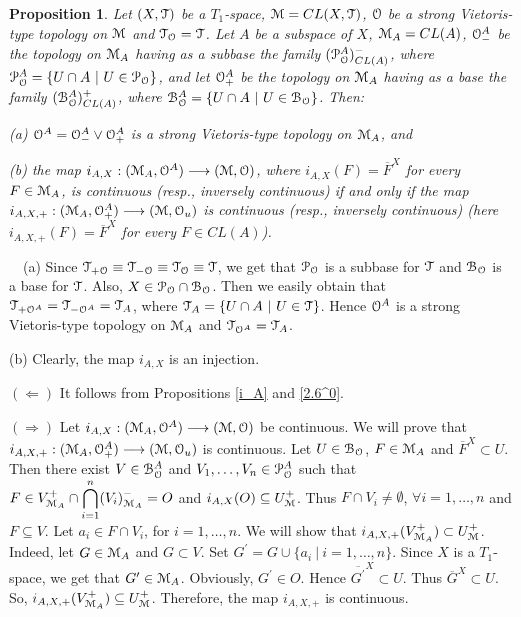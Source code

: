 \documentclass[12pt,draft,leqno]{article}
\newtheorem{pro}[theorem]{Proposition}
\def\ap{^\prime}
\def\st{\ |\ }
\def\BB{{\cal B}}
\def\MM{{\cal M}}
\def\OO{{\cal O}}
\def\PP{{\cal P}}
\def\TT{{\cal T}}
\def\doc{\hspace{-1cm}{\em Proof.}~~}
\begin{document}
\begin{pro}\label{i_A,Xnepr}
Let $(X,\TT)$ be a $T_1$-space, $\MM=CL(X,\TT)$, $\OO$ be a strong Vietoris-type topology on $\MM$ and $\TT_{\OO}=\TT$. Let $A$ be a subspace of $X$, $\MM_A=CL(A)$, $\OO_-^A$ be the topology on $\MM_A$ having as a subbase the family $(\PP_{\OO}^A)_{CL(A)}^-$, where $\PP_{\OO}^A=\{U\cap A\st U\in\PP_{\OO}\}$, and let $\OO_+^A$ be the topology on $\MM_A$ having as a base the family $(\BB_{\OO}^A)_{CL(A)}^+$, where $\BB_{\OO}^A=\{U\cap A\st U\in\BB_{\OO}\}$. Then:

\smallskip

\noindent (a) $\OO^A=\OO_-^A\vee\OO_+^A$ is a strong Vietoris-type topology on $\MM_A$, and

\smallskip

\noindent (b) the map $i_{A,X}:(\MM_A,\OO^A)\longrightarrow(\MM,\OO)$, where $i_{A,X}(F)=\overline{F}^X$ for every $F\in\MM_A$, is continuous (resp., inversely continuous) if and only if the map $i_{A,X,+}:(\MM_A,\OO_+^A)\longrightarrow(\MM,\OO_u)$ is continuous (resp., inversely continuous) (here $i_{A,X,+}(F)=\overline{F}^X$ for every $F\in CL(A)$).
\end{pro}

\doc (a) Since $\TT_{+\OO}\equiv\TT_{-\OO}\equiv\TT_{\OO}\equiv\TT$, we get that $\PP_{\OO}$ is a subbase for $\TT$ and $\BB_{\OO}$ is a base for $\TT$. Also, $X\in\PP_{\OO}\cap\BB_{\OO}$. Then we easily obtain that $\TT_{+\OO^A}=\TT_{-\OO^A}=\TT_A$, where $\TT_A=\{U\cap A\st U\in\TT\}$. Hence $\OO^A$ is a strong Vietoris-type topology on $\MM_A$ and $\TT_{\OO^A}=\TT_A$.

\smallskip

\noindent (b) Clearly, the map $i_{A,X}$ is an injection.

\smallskip

\noindent $(\Leftarrow)$ It follows from Propositions \ref{i_A} and \ref{2.6^0}.

\smallskip

\noindent $(\Rightarrow)$ Let $i_{A,X}:(\MM_A,\OO^A)\longrightarrow(\MM,\OO)$ be continuous. We will prove that $i_{A,X,+}:(\MM_A,\OO_+^A)\longrightarrow(\MM,\OO_u)$ is continuous. Let $U\in\BB_{\OO}$, $F\in\MM_A$ and $\overline{F}^X\subset U$. Then there exist $V\in\BB_{\OO}^A$ and $V_1,\dots,V_n\in\PP_{\OO}^A$ such that $\displaystyle F\in V_{\MM_A}^+\cap\bigcap_{i=1}^n(V_i)_{\MM_A}^-=O$ and $i_{A,X}(O)\subseteq U_{\MM}^+$. Thus $F\cap V_i\not=\emptyset$, $\forall i=1,\dots,n$ and $F\subseteq V$. Let $a_i\in F\cap V_i$, for $i=1,\dots,n$. We will show that $i_{A,X,+}(V_{\MM_A}^+)\subset U_{\MM}^+$. Indeed, let $G\in\MM_A$ and $G\subset V$. Set $G\ap=G\cup\{a_i\st i=1,\dots,n\}$. Since $X$ is a $T_1$-space, we get that $G\ap\in\MM_A$. Obviously, $G\ap\in O$. Hence $\overline{G\ap}^X\subset U$. Thus  $\overline{G}^X\subset U$. So, $i_{A,X,+}(V_{\MM_A}^+)\subseteq U_{\MM}^+$. Therefore, the map $i_{A,X,+}$ is continuous.
\end{document}
